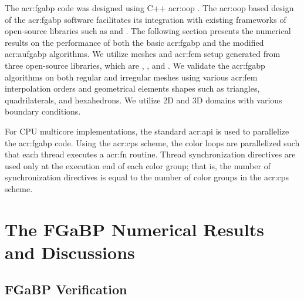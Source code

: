 The \gls{acr:fgabp} code was designed using C++ \gls{acr:oop} \cite{bib:c++stroustrup2013,bib:c++prata2004}.
The \gls{acr:oop} based design of the \gls{acr:fgabp} software facilitates its integration with existing frameworks of open-source libraries such as \dealName{} \cite{bib:dealii2007} and  \cite{bib:getfem}.
The following section presents the numerical results on the performance of both the basic \gls{acr:fgabp} and the modified \gls{acr:aufgabp} algorithms.
We utilize meshes and \gls{acr:fem} setup generated from three open-source libraries, which are , , and \dealName{}.
We validate the \gls{acr:fgabp} algorithms on both regular and irregular meshes using various \gls{acr:fem} interpolation orders and geometrical elements shapes such as triangles, quadrilaterals, and hexahedrons.
We utilize 2D and 3D domains with various boundary conditions.


For CPU multicore implementations, the  \cite{bib:openmp} standard \gls{acr:api} is used to parallelize the \gls{acr:fgabp} code.
Using the \gls{acr:cps} scheme, the color loops are parallelized such that each thread executes a \gls{acr:fn} routine.
Thread synchronization directives are used only at the execution end of each color group; that is, the number of synchronization directives is equal to the number of color groups in the \gls{acr:cps} scheme.


\section{The FGaBP Numerical Results and Discussions}
\label{sec:fgabpRes}

\subsection{FGaBP Verification}
\label{sec:fgabpVer}

